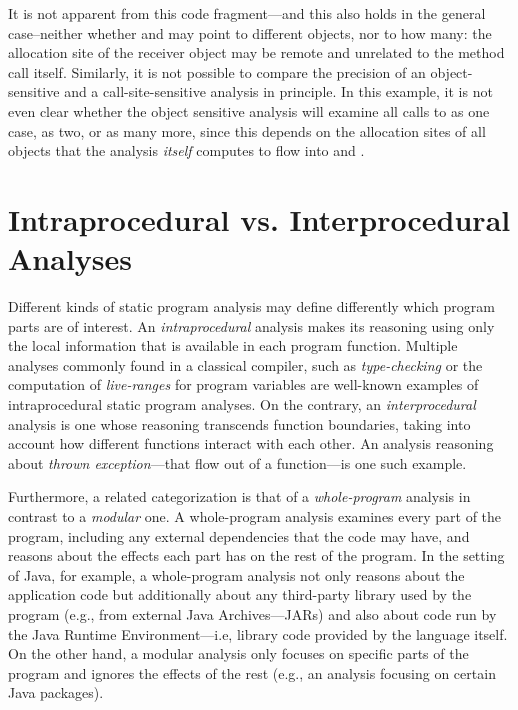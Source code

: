 It is not apparent from this code fragment---and this also holds in the general case--neither whether  and  may point to different objects, nor to how many: the allocation site of the receiver object may be remote and unrelated to the method call itself. Similarly, it is not possible to compare the precision of an object-sensitive and a call-site-sensitive analysis in principle. In this example, it is not even clear whether the object sensitive analysis will examine all calls to  as one case, as two, or as many more, since this depends on the allocation sites of all objects that the analysis \emph{itself} computes to flow into  and .


\section{Intraprocedural vs. Interprocedural Analyses}

Different kinds of static program analysis may define differently which program parts are of interest. An \emph{intraprocedural} analysis makes its reasoning using only the local information that is available in each program function. Multiple analyses commonly found in a classical compiler, such as \emph{type-checking} or the computation of \emph{live-ranges} for program variables are well-known examples of intraprocedural static program analyses. On the contrary, an \emph{interprocedural} analysis is one whose reasoning transcends function boundaries, taking into account how different functions interact with each other. An analysis reasoning about \emph{thrown exception}---that flow out of a function---is one such example.

Furthermore, a related categorization is that of a \emph{whole-program} analysis in contrast to a \emph{modular} one. A whole-program analysis examines every part of the program, including any external dependencies that the code may have, and reasons about the effects each part has on the rest of the program. In the setting of Java, for example, a whole-program analysis not only reasons about the application code but additionally about any third-party library used by the program (e.g., from external Java Archives---JARs) and also about code run by the Java Runtime Environment---i.e, library code provided by the language itself. On the other hand, a modular analysis only focuses on specific parts of the program and ignores the effects of the rest (e.g., an analysis focusing on certain Java packages).

